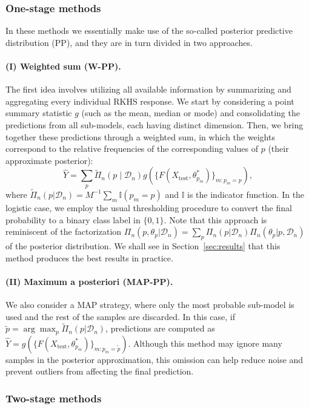 \documentclass{article}
\numberwithin{equation}{section}
\theoremstyle{plain}
\theoremstyle{definition}
\begin{document}
\subsubsection*{One-stage methods}

In these methods we essentially make use of the so-called posterior predictive distribution (PP), and they are in turn divided in two approaches.

\paragraph*{(I) Weighted sum (W-PP).} The first idea involves utilizing all available information by summarizing and aggregating every individual RKHS response. We start by considering a point summary statistic \(g\) (such as the mean, median or mode) and consolidating the predictions from all sub-models, each having distinct dimension. Then, we bring together these predictions through a weighted sum, in which the weights correspond to the relative frequencies of the corresponding values of \(p\) (their approximate posterior):
\[
  \hat Y = \sum_{p} \tilde\Pi_n(p\mid\mathcal D_n) g(\{F(X_{\text{test}}, \theta^*_{p_m})\}_{m:p_m=p}),
  \]
where \(\tilde \Pi_n(p|\mathcal D_n) = M^{-1}\sum_m \mathbb I(p_m=p)\) and \(\mathbb I\) is the indicator function. In the logistic case, we employ the usual thresholding procedure to convert the final probability to a binary class label in \(\{0,1\}\). Note that this approach is reminiscent of the factorization \(\Pi_n(p, \theta_p|\mathcal D_n) = \sum_{p}\Pi_n(p|\mathcal D_n)\Pi_n(\theta_p|p, \mathcal D_n)\) of the posterior distribution. We shall see in Section~\ref{sec:results} that this method produces the best results in practice.

\paragraph*{(II) Maximum a posteriori (MAP-PP).} We also consider a MAP strategy, where only the most probable sub-model is used and the rest of the samples are discarded. In this case, if \(\tilde p = \arg\max_p \tilde  \Pi_n(p|\mathcal D_n)\), predictions are computed as \(\hat Y = g(\{F(X_{\text{test}}, \theta^*_{p_m})\}_{m:p_m=\tilde p})\). Although this method may ignore many samples in the posterior approximation, this omission can help reduce noise and prevent outliers from affecting the final prediction.

\subsubsection*{Two-stage methods}
\end{document}
